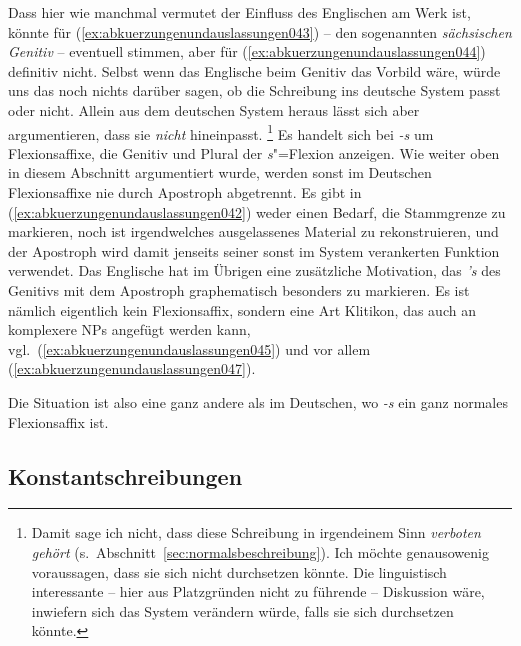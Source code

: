 Dass hier wie manchmal vermutet der Einfluss des Englischen am Werk ist, könnte für (\ref{ex:abkuerzungenundauslassungen043}) -- den sogenannten \textit{sächsischen Genitiv} -- eventuell stimmen, aber für (\ref{ex:abkuerzungenundauslassungen044}) definitiv nicht.
Selbst wenn das Englische beim Genitiv das Vorbild wäre, würde uns das noch nichts darüber sagen, ob die Schreibung ins deutsche System passt oder nicht.
Allein aus dem deutschen System heraus lässt sich aber argumentieren, dass sie \textit{nicht} hineinpasst.%
\footnote{Damit sage ich nicht, dass diese Schreibung in irgendeinem Sinn \textit{verboten gehört} (s.\ Abschnitt~\ref{sec:normalsbeschreibung}).
Ich möchte genausowenig voraussagen, dass sie sich nicht durchsetzen könnte.
Die linguistisch interessante -- hier aus Platzgründen nicht zu führende -- Diskussion wäre, inwiefern sich das System verändern würde, falls sie sich durchsetzen könnte.}
Es handelt sich bei \textit{-s} um Flexionsaffixe, die Genitiv und Plural der \textit{s}"=Flexion anzeigen.
Wie weiter oben in diesem Abschnitt argumentiert wurde, werden sonst im Deutschen Flexionsaffixe nie durch Apostroph abgetrennt.
Es gibt in (\ref{ex:abkuerzungenundauslassungen042}) weder einen Bedarf, die Stammgrenze zu markieren, noch ist irgendwelches ausgelassenes Material zu rekonstruieren, und der Apostroph wird damit jenseits seiner sonst im System verankerten Funktion verwendet.
Das Englische hat im Übrigen eine zusätzliche Motivation, das \textit{'s} des Genitivs mit dem Apostroph graphematisch besonders zu markieren.
Es ist nämlich eigentlich kein Flexionsaffix, sondern eine Art Klitikon, das auch an komplexere NPs angefügt werden kann, vgl.\ (\ref{ex:abkuerzungenundauslassungen045}) und vor allem (\ref{ex:abkuerzungenundauslassungen047}).

\begin{exe}
  \ex\label{ex:abkuerzungenundauslassungen045}
  \begin{xlist}
  \end{xlist}
\end{exe}

Die Situation ist also eine ganz andere als im Deutschen, wo \textit{-s} ein ganz normales Flexionsaffix ist.

\subsection{Konstantschreibungen}
\label{sec:konstantschreibungen}


